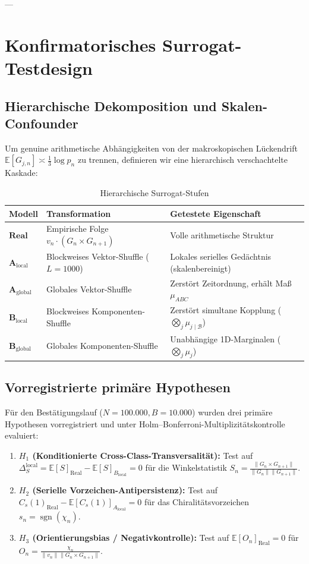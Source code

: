 \documentclass[11pt,a4paper]{article}
\theoremstyle{plain}
\theoremstyle{definition}
\theoremstyle{remark}
\DeclareMathOperator{\sgn}{sgn}
\begin{document}
---

\section{Konfirmatorisches Surrogat-Testdesign}

\subsection{Hierarchische Dekomposition und Skalen-Confounder}

Um genuine arithmetische Abhängigkeiten von der makroskopischen Lückendrift $\mathbb{E}[G_{j,n}] \asymp \frac{1}{3}\log p_n$ zu trennen, definieren wir eine hierarchisch verschachtelte Kaskade:

\begin{table}[h]
\centering
\small
\caption{Hierarchische Surrogat-Stufen}
\begin{tabular}{lll}
\toprule
Modell & Transformation & Getestete Eigenschaft \\
\midrule
$\mathbf{Real}$ & Empirische Folge $v_n \cdot (G_n \times G_{n+1})$ & Volle arithmetische Struktur \\
$\mathbf{A_{\mathrm{local}}}$ & Blockweises Vektor-Shuffle ($L=1000$) & Lokales serielles Gedächtnis (skalenbereinigt) \\
$\mathbf{A_{\mathrm{global}}}$ & Globales Vektor-Shuffle & Zerstört Zeitordnung, erhält Maß $\mu_{ABC}$ \\
$\mathbf{B_{\mathrm{local}}}$ & Blockweises Komponenten-Shuffle & Zerstört simultane Kopplung ($\bigotimes_j \mu_{j \mid \mathcal{B}}$) \\
$\mathbf{B_{\mathrm{global}}}$ & Globales Komponenten-Shuffle & Unabhängige 1D-Marginalen ($\bigotimes_j \mu_j$) \\
\bottomrule
\end{tabular}
\end{table}

\subsection{Vorregistrierte primäre Hypothesen}

Für den Bestätigungslauf ($N=100.000, B=10.000$) wurden drei primäre Hypothesen vorregistriert und unter Holm--Bonferroni-Multiplizitätskontrolle evaluiert:
\begin{enumerate}
    \item \textbf{$H_1$ (Konditionierte Cross-Class-Transversalität):} Test auf $\Delta_S^{\mathrm{local}} = \mathbb{E}[S]_{\mathrm{Real}} - \mathbb{E}[S]_{B_{\mathrm{local}}} = 0$ für die Winkelstatistik $S_n = \frac{\|G_n \times G_{n+1}\|}{\|G_n\|\|G_{n+1}\|}$.
    \item \textbf{$H_2$ (Serielle Vorzeichen-Antipersistenz):} Test auf $C_s(1)_{\mathrm{Real}} - \mathbb{E}[C_s(1)]_{A_{\mathrm{local}}} = 0$ für das Chiralitätsvorzeichen $s_n = \sgn(\chi_n)$.
    \item \textbf{$H_3$ (Orientierungsbias / Negativkontrolle):} Test auf $\mathbb{E}[O_n]_{\mathrm{Real}} = 0$ für $O_n = \frac{\chi_n}{\|v_n\|\|G_n \times G_{n+1}\|}$.
\end{enumerate}
\end{document}
